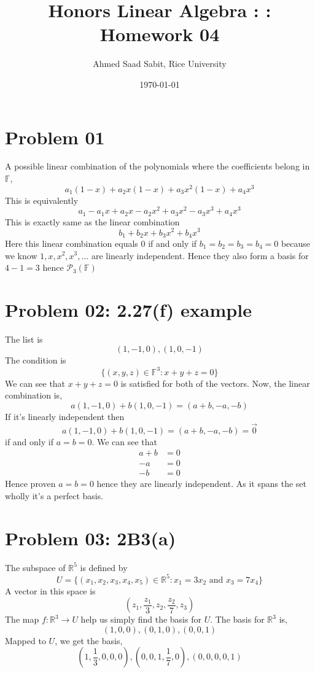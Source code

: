 \documentclass[letter]{article}
\title{Honors Linear Algebra : : Homework 04}
\author{Ahmed Saad Sabit, Rice University}
\date{\today}
\begin{document}
\maketitle

	\section*{Problem 01}
A possible linear combination of the polynomials where the coefficients belong in $\mathbb{F}$, 
\[
a_1(1-x) + a_2x(1-x) + a_3x^2(1-x) + a_4x^3
\]
This is equivalently 
\[
a_1  - a_1 x + a_2 x - a_2 x^2 + a_3x^2 - a_3 x^3 + a_4 x^3 
\]
This is exactly same as the linear combination 
\[
b_1 + b_2 x + b_3 x^2 + b_4 x^3
\]
Here this linear combination equals $0$ if and only if $b_1 = b_2 = b_3 = b_4 = 0$ because we know $1,x,x^2, x^3, \ldots$ are linearly independent. Hence they also form a basis for $4-1 = 3$ hence $\mathcal P_3 (\mathbb{F})$

\section*{Problem 02: 2.27(f) example} 
The list is 
\[
	(1,-1,0) , (1,0,-1)
\] 
The condition is 
\[
\{(x,y,z) \in \mathbb{F}^{3}: x+y+z=0\} 
\] 
We can see that $x+y+z=0$ is satisfied for both of the vectors. Now, the linear combination is,
\[
a(1,-1,0) + b(1,0,-1) = (a+b, -a, -b) 
\]
If it's linearly independent then 
\[
a(1,-1,0) + b(1,0,-1) = (a+b, -a, -b) =\vec{0}
\]
if and only if $a=b=0$. We can see that 
\begin{align*}
	a+b &= 0 \\
	-a &= 0 \\
	-b &= 0 
\end{align*}
Hence proven $a=b=0$ hence they are linearly independent. As it spans the set wholly it's a perfect basis. 


	\section*{Problem 03: 2B3(a)}

The subspace of $\mathbb{R}^{5}$ is defined by 
\[
U = \{(x_1,x_2,x_3,x_4,x_5) \in \mathbb{R}^{5}: x_1 = 3 x_2 \text{ and } x_3 = 7 x_4\} 
\] 
A vector in this space is 
\[
	\left(z_1, \frac{z_1}{3}, z_2, \frac{z_2}{7}, z_3 \right)
\]
The map $f: \mathbb{R}^{3} \to U$ help us simply find the basis for $U$. The basis for $\mathbb{R}^{3}$ is, 
\[
	(1,0,0),(0,1,0),(0,0,1)
\] 
Mapped to $U$, we get the basis, 
\[
	(1, \frac{1}{3}, 0,0,0), (0,0,1,\frac{1}{7},0),(0,0,0,0,1)
\]
\end{document}

